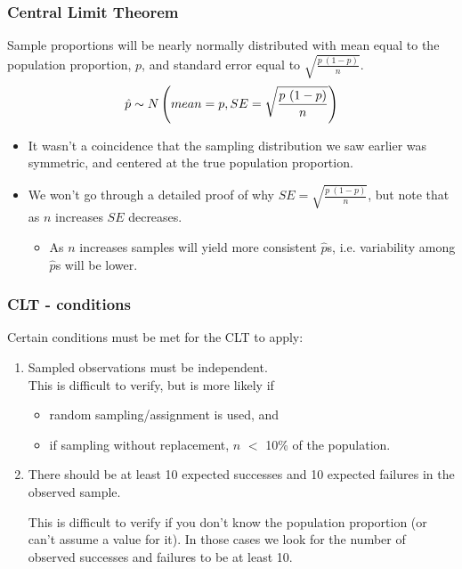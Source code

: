 \documentclass[notes,11pt, aspectratio=169]{beamer}
\begin{document}

\begin{frame}
\frametitle{Central Limit Theorem}

{Sample proportions will be nearly normally distributed with mean equal to the population proportion, $p$, and standard error equal to $\sqrt{\frac{p~(1-p)}{n}}$.
\[ \hat{p} \sim N \left(  mean = p, SE = \sqrt{\frac{p~(1-p)}{n}}  \right) \]
}

\begin{itemize}

\item It wasn't a coincidence that the sampling distribution we saw earlier was symmetric, and centered at the true population proportion.

\item We won't go through a detailed proof of why $SE =  \sqrt{\frac{p~(1-p)}{n}}$, but note that as $n$ increases $SE$ decreases.
\begin{itemize}
\item As $n$ increases samples will yield more consistent $\hat{p}$s, i.e. variability among $\hat{p}$s will be lower.
\end{itemize}

\end{itemize}

\end{frame}


\begin{frame}
\frametitle{CLT - conditions}

Certain conditions must be met for the CLT to apply:

\begin{enumerate}

\item {} Sampled observations must be independent. \\

This is difficult to verify, but is more likely if
\begin{itemize}
\item random sampling/assignment is used, and
\item if sampling without replacement, $n$ $<$ 10\% of the population.
\end{itemize}

\pause

\item {} There should be at least 10 expected successes and 10 expected failures in the observed sample.

This is difficult to verify if you don't know the population proportion (or can't assume a value for it). In those cases we look for the number of observed successes and failures to be at least 10.

\end{enumerate}

\end{frame}
\end{document}
